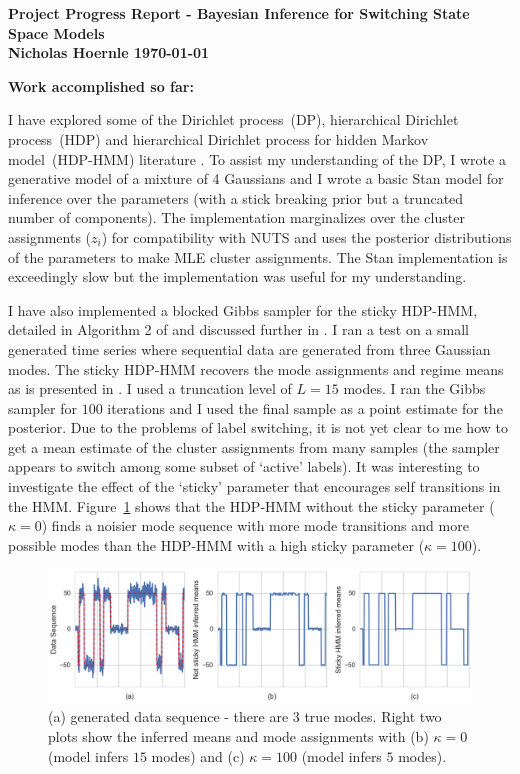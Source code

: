 \documentclass[twoside]{article}
\begin{document}
\textbf{Project Progress Report - Bayesian Inference for Switching State Space Models}\\
\textbf{Nicholas Hoernle \hfill \today}

\textbf{Work accomplished so far:}

I have explored some of the Dirichlet process~(DP), hierarchical Dirichlet process~(HDP) and hierarchical Dirichlet process for hidden Markov model~(HDP-HMM) literature \cite{fox2007developing,fox2011bayesian,fox2008hdp,teh2005sharing}. To assist my understanding of the DP, I wrote a generative model of a mixture of 4 Gaussians and I wrote a basic Stan model for inference over the parameters (with a stick breaking prior but a truncated number of components). The implementation marginalizes over the cluster assignments ($z_i$) for compatibility with NUTS and uses the posterior distributions of the parameters to make MLE cluster assignments. The Stan implementation is exceedingly slow but the implementation was useful for my understanding.

I have also implemented a blocked Gibbs sampler for the sticky HDP-HMM, detailed in Algorithm 2 of \cite{fox2007developing} and discussed further in \cite{fox2008hdp}. I ran a test on a small generated time series where sequential data are generated from three Gaussian modes. The sticky HDP-HMM recovers the mode assignments and regime means as is presented in \cite{fox2007developing}. I used a truncation level of $L=15$ modes. I ran the Gibbs sampler for $100$ iterations and I used the final sample as a point estimate for the posterior. Due to the problems of label switching, it is not yet clear to me how to get a mean estimate of the cluster assignments from many samples (the sampler appears to switch among some subset of `active' labels). It was interesting to investigate the effect of the `sticky' parameter that encourages self transitions in the HMM. Figure~\ref{fig:sticky_hmm_outputs} shows that the HDP-HMM without the sticky parameter ($\kappa = 0$) finds a noisier mode sequence with more mode transitions and more possible modes than the HDP-HMM with a high sticky parameter ($\kappa = 100$).

\begin{figure}[H]
\centering
\includegraphics[width=14cm]{sticky_hmm_outputs.png}
\caption{(a) generated data sequence - there are $3$ true modes. Right two plots show the inferred means and mode assignments with (b) $\kappa=0$ (model infers $15$ modes) and (c) $\kappa=100$ (model infers $5$ modes).}
\label{fig:sticky_hmm_outputs}
\end{figure}
\end{document}
